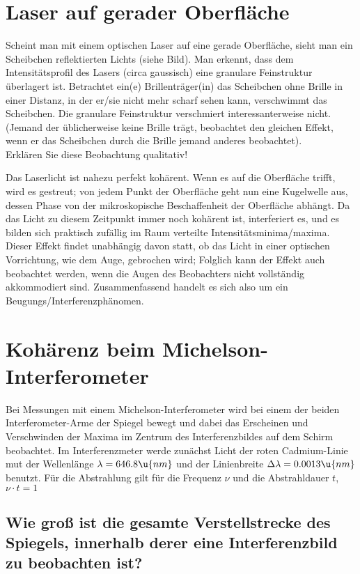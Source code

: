 \documentclass[ex]{exercise}
\begin{document}
\section{Laser auf gerader Oberfläche}
Scheint man mit einem optischen Laser auf eine gerade Oberfläche, sieht man ein Scheibchen reflektierten Lichts
(siehe Bild).
Man erkennt, dass dem Intensitätsprofil des Lasers (circa gaussisch) eine granulare Feinstruktur überlagert ist.
Betrachtet ein(e) Brillenträger(in) das Scheibchen ohne Brille in einer Distanz, in der er/sie nicht mehr scharf
sehen kann, verschwimmt das Scheibchen. Die granulare Feinstruktur verschmiert interessanterweise nicht.
(Jemand der üblicherweise keine Brille trägt, beobachtet den gleichen Effekt, wenn er das Scheibchen durch die
Brille jemand anderes beobachtet).\\
Erklären Sie diese Beobachtung qualitativ!

\dottedlinett

Das Laserlicht ist nahezu perfekt kohärent. Wenn es auf die Oberfläche 
trifft, wird es gestreut; von jedem Punkt der Oberfläche geht nun eine Kugelwelle aus,
dessen Phase von der mikroskopische Beschaffenheit der Oberfläche abhängt. 
Da das Licht zu diesem Zeitpunkt immer noch kohärent ist, interferiert es, und es bilden
sich praktisch zufällig im Raum verteilte Intensitätsminima/maxima. 
Dieser Effekt findet unabhängig davon statt, ob das Licht in einer optischen Vorrichtung, wie 
dem Auge, gebrochen wird; Folglich kann der Effekt auch beobachtet werden, wenn die 
Augen des Beobachters nicht vollständig akkommodiert sind.
Zusammenfassend handelt es sich also um ein Beugungs/Interferenzphänomen.


\section{Kohärenz beim Michelson-Interferometer}
Bei Messungen mit einem Michelson-Interferometer wird bei einem der beiden 
Interferometer-Arme der Spiegel bewegt und dabei das Erscheinen und Verschwinden der 
Maxima im Zentrum des Interferenzbildes auf dem Schirm beobachtet. Im Interferenzmeter
werde zunächst Licht der roten Cadmium-Linie mut der Wellenlänge \(\lambda=646.8\u{nm}\)
und der Linienbreite \(\Delta \lambda = 0.0013\u{nm}\) benutzt. Für die Abstrahlung 
gilt für die Frequenz \(\nu\) und die Abstrahldauer \(t\), \(\nu \cdot t=1\)

\subsection{Wie gro{\ss} ist die gesamte Verstellstrecke des Spiegels, innerhalb derer eine 
Interferenzbild zu beobachten ist?}
\end{document}
